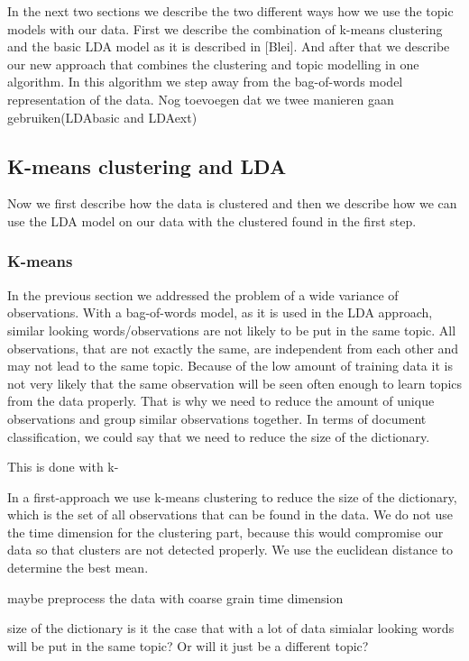\documentclass[11pt,a4paper]{article}
\begin{document}
In the next two sections we describe the two different ways how we use the topic models with our data. First we describe the combination of k-means clustering and the basic LDA model as it is described in [Blei]. And after that we describe our new approach that combines the clustering and topic modelling in one algorithm. In this algorithm we step away from the bag-of-words model representation of the data.
 Nog toevoegen dat we twee manieren gaan gebruiken(LDAbasic and LDAext)


\subsection{K-means clustering and LDA}
 Now we first describe how the data is clustered and then we describe how we can use the LDA model on our data with the clustered found in the first step.

  \subsubsection{K-means}
 In the previous section we addressed the problem of a wide variance of observations. With a bag-of-words model, as it is used in the LDA approach, similar looking words/observations are not likely to be put in the same topic. All observations, that are not exactly the same, are independent from each other and may not lead to the same topic. Because of the low amount of training data it is not very likely that the same observation will be seen often enough to learn topics from the data properly.
That is why we need to reduce the amount of unique observations and group similar observations together. In terms of document classification, we could say that we need to reduce the size of the dictionary.


This is done with k-

In a first-approach we use k-means clustering to reduce the size of the dictionary, which is the set of all observations that can be found in the data.
We do not use the time dimension for the clustering part, because this would compromise our data so that clusters are not detected properly. We use the euclidean distance to determine the best mean.

maybe preprocess the data with coarse grain time dimension

size of the dictionary
is it the case that with a lot of data simialar looking words will be put in the same topic? Or will it just be a different topic?
\end{document}
